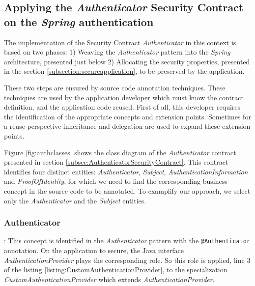 \subsection{Applying the \textit{Authenticator} Security Contract on the \textit{Spring} authentication}


The implementation of the Security Contract \textit{Authenticator} in this context is based on two phases: 1) Weaving the \textit{Authenticator} pattern into the \textit{Spring} architecture, presented just below 2) Allocating the security properties, presented in the section \ref{subsection:secureapplication}, to be preserved by the application.


These two steps are ensured by source code annotation techniques. These techniques are used by the application developer which must know the contract definition, and the application code reused.
First of all, this developer requires the identification of the appropriate concepts and extension points. Sometimes for a reuse perspective inheritance and delegation are used to expand these extension points.

Figure \ref{fig:authclasses} shows the class diagram of the \textit{Authenticator} contract presented in section \ref{subsec:AuthenticatorSecurityContract}. 
This contract identifies four distinct entities: \textit{Authenticator}, \textit{Subject}, \textit{AuthenticationInformation} and \textit{ProofOfIdentity}, for which we need to find the corresponding business concept in the source code to be annotated. To examplify our approach, we select only the \textit{Authenticator} and the \textit{Subject} entities.



\subsubsection{Authenticator}: This concept is identified in the \textit{Authenticator} pattern with the \texttt{@Authenticator} annotation. On the application to secure, the Java interface \textit{AuthenticationProvider} plays the corresponding role. So this role is applied, line 3 of the listing \ref{listing:CustomAuthenticationProvider}, to the specialization \textit{CustomAuthenticationProvider} which extends \textit{AuthenticationProvider}. 


